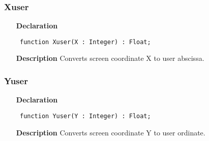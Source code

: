 \documentclass[12pt,a4paper,oneside]{report}
\newcommand{\declarationitem}[1]{\textbf{#1}}
\newcommand{\descriptiontitle}[1]{\textbf{#1}}
\newcommand{\code}[1]{\texttt{#1}}
\begin{document}
\subsubsection{Xuser}
\label{uwinplot-Xuser}
\begin{itemize}\item[\declarationitem{Declaration}\hfill]
	\begin{flushleft}
		\code{
			function Xuser(X : Integer) : Float;}
		
	\end{flushleft}
	
	\par
	\item[\descriptiontitle{Description}]
	Converts screen coordinate X to user abscissa.
	
\end{itemize}
\subsubsection{Yuser}
\label{uwinplot-Yuser}
\begin{itemize}\item[\declarationitem{Declaration}\hfill]
	\begin{flushleft}
		\code{
			function Yuser(Y : Integer) : Float;}
		
	\end{flushleft}
	
	\par
	\item[\descriptiontitle{Description}]
	Converts screen coordinate Y to user ordinate.
\end{itemize}
\printindex[types]
\printindex[const]
\printindex[proc]
\printindex
\end{document}
